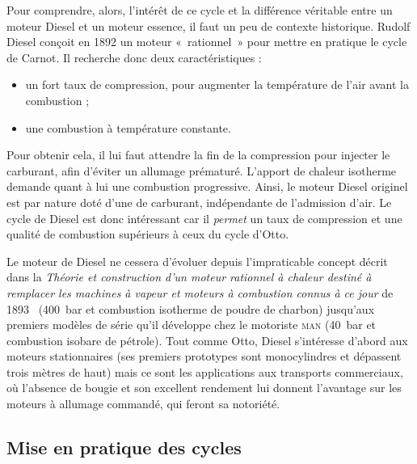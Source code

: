 		Pour comprendre, alors, l’intérêt de ce cycle et la différence véritable entre un moteur Diesel et un moteur essence, il faut un peu de contexte historique. Rudolf Diesel conçoit en 1892 un moteur «~rationnel~» pour mettre en pratique le cycle de Carnot. Il recherche donc deux caractéristiques :
		\begin{itemize}
			\item un fort taux de compression, pour augmenter la température de l’air avant la combustion ;
			\item une combustion à température constante.
		\end{itemize}
		Pour obtenir cela, il lui faut attendre la fin de la compression pour injecter le carburant, afin d’éviter un allumage prématuré. L’apport de chaleur isotherme demande quant à lui une combustion progressive. Ainsi, le moteur Diesel originel est par nature doté d’une  de carburant, indépendante de l’admission d’air. Le cycle de Diesel est donc intéressant car il \emph{permet} un taux de compression et une qualité de combustion supérieurs à ceux du cycle d’Otto.
		
		Le moteur de Diesel ne cessera d’évoluer depuis l’impraticable concept décrit dans la \textit{Théorie et construction d’un moteur rationnel à chaleur destiné à remplacer les machines à vapeur et moteurs à combustion connus à ce jour} de 1893~\cite{diesel1893,diesel1893en} (\SI{400}{\bar} et combustion isotherme de poudre de charbon) jusqu’aux premiers modèles de série qu’il développe chez le motoriste \textsc{man} (\SI{40}{\bar} et combustion isobare de pétrole). Tout comme Otto, Diesel s’intéresse d’abord aux moteurs stationnaires (ses premiers prototypes sont monocylindres et dépassent trois mètres de haut) mais ce sont les applications aux transports commerciaux, où l’absence de bougie et son excellent rendement lui donnent l’avantage sur les moteurs à allumage commandé, qui feront sa notoriété. 

	\subsection{Mise en pratique des cycles}
	\label{ch_cycles_pistons_reels}

